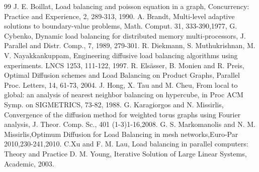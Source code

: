 \documentclass{report}
\begin{document}
\begin{thebibliography}{99}
 J. E. Boillat, Load balancing and poisson equation in a
graph, Concurrency: Practice and Experience, 2, 289-313, 1990.
 A. Brandt, Multi-level adaptive solutions to boundary-value problems,
Math. Comput. 31,
333-390,1977,
 G. Cybenko, Dynamic load balancing for distributed
memory multi-processors, J. Parallel and Distr. Comp., 7, 1989, 279-301.
 R. Diekmann, S. Muthukrishnan, M. V. Nayakkankuppam,
Engineering diffusive load balancing algorithms using experiments. LNCS
1253, 111-122, 1997.
 R. Els\"asser, B. Monien and R. Preis, Optimal Diffusion
schemes and Load Balancing on Product Graphs,
Parallel Proc. Letters, 14, 61-73, 2004.
 J. Hong, X. Tau and M. Cheu, From local to global:
an analysis of nearest neighbor balancing on hypercube, in Proc
ACM Symp. on SIGMETRICS, 73-82, 1988.
 G. Karagiorgos and N. Missirlis, Convergence of the
diffusion method for weighted torus graphs using Fourier analysis, J.
Theor. Comp. Sc., 401 (1-3)1-16,2008.
 G. S. Markomanolis and N. M. Missirlis,Optimum
Diffusion for Load Balancing in mesh networks,Euro-Par 2010,230-241,2010.
C.Xu and F. M. Lau, Load balancing in parallel computers:
Theory and Practice
 D. M. Young, Iterative Solution of Large Linear Systems, Academic, 2003.
\end{thebibliography}
\end{document}
